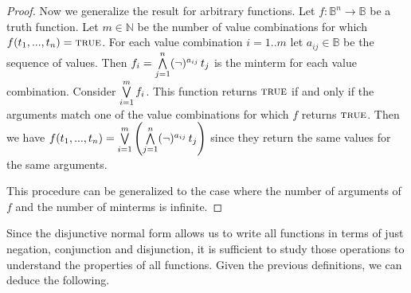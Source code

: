 \documentclass[11pt,letterpaper,fleqn]{memoir} %
\begin{document}
\begin{mathSection}
\begin{proof}
		Now we generalize the result for arbitrary functions. Let $f : \mathbb{B}^n \to \mathbb{B}$ be a truth function. Let $m \in \mathbb{N}$ be the number of value combinations for which $f(t_1, ..., t_n) = \textsc{true}$. For each value combination $i=1..m$ let $a_{ij} \in \mathbb{B}$ be the sequence of values. Then $f_i = \bigwedge \limits_{j=1}^n (\neg)^{a_{ij}} \, t_j$ is the minterm for each value combination. Consider $\bigvee \limits_{i=1}^m f_i$. This function returns $\textsc{true}$ if and only if the arguments match one of the value combinations for which $f$ returns $\textsc{true}$. Then we have $f(t_1, ..., t_n) =\bigvee \limits_{i=1}^m \left( \bigwedge \limits_{j=1}^n (\neg)^{a_{ij}} \, t_j \right)$ since they return the same values for the same arguments.
		
		This procedure can be generalized to the case where the number of arguments of $f$ and the number of minterms is infinite.
	\end{proof}
\end{mathSection}

Since the disjunctive normal form allows us to write all functions in terms of just negation, conjunction and disjunction, it is sufficient to study those operations to understand the properties of all functions. Given the previous definitions, we can deduce the following.
\end{document}
